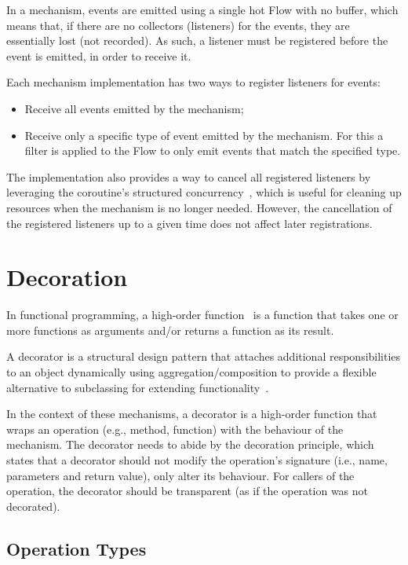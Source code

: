 In a mechanism, events are emitted using a single hot Flow with no buffer, which means that, if there are no collectors (listeners) for the events, they are essentially lost (not recorded).
As such, a listener must be registered before the event is emitted, in order to receive it.

Each mechanism implementation has two ways to register listeners for events:

\begin{itemize}
    \item Receive all events emitted by the mechanism;
    \item Receive only a specific type of event emitted by the mechanism.
    For this a filter is applied to the Flow to only emit events that match the specified type.
\end{itemize}

The implementation also provides a way to cancel all registered listeners by leveraging the coroutine's structured concurrency~\cite{kotlin-coroutines}, which is useful for cleaning up resources when the mechanism is no longer needed.
However, the cancellation of the registered listeners up to a given time does not affect later registrations.


\section{Decoration}\label{sec:decoration}

In functional programming, a high-order function~\cite{higher-order-functions} is a function
that takes one or more functions as arguments and/or returns a function as its result.

A decorator is a structural design pattern
that attaches additional responsibilities to an object dynamically using aggregation/composition to provide a flexible alternative to subclassing for extending functionality~\cite{design-patterns}.

In the context of these mechanisms,
a decorator is a high-order function that wraps an operation
(e.g., method, function) with the behaviour of the mechanism.
The decorator needs to abide by the decoration principle,
which states that a decorator should not modify the operation's signature (i.e., name, parameters and return value), only alter its behaviour.
For callers of the operation, the decorator should be transparent (as if the operation was not decorated).

\subsection{Operation Types}\label{subsec:operation-types}

